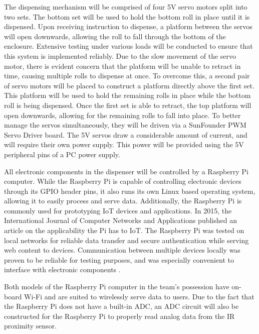 \par The dispensing mechanism will be comprised of four 5V servo motors split into two sets. The bottom set will be used to hold the bottom roll in place until it is dispensed. Upon receiving instruction to dispense, a platform between the servos will open downwards, allowing the roll to fall through the bottom of the enclosure. Extensive testing under various loads will be conducted to ensure that this system is implemented reliably. Due to the slow movement of the servo motor, there is evident concern that the platform will be unable to retract in time, causing multiple rolls to dispense at once. To overcome this, a second pair of servo motors will be placed to construct a platform directly above the first set. This platform will be used to hold the remaining rolls in place while the bottom roll is being dispensed. Once the first set is able to retract, the top platform will open downwards, allowing for the remaining rolls to fall into place. To better manage the servos simultaneously, they will be driven via a SunFounder PWM Servo Driver board. The 5V servos draw a considerable amount of current, and will require their own power supply. This power will be provided using the 5V peripheral pins of a PC power supply. 

\par All electronic components in the dispenser will be controlled by a Raspberry Pi computer. While the Raspberry Pi is capable of controlling electronic devices through its GPIO header pins, it also runs its own Linux based operating system, allowing it to easily process and serve data. Additionally, the Raspberry Pi is commonly used for prototyping IoT devices and applications. In 2015, the International Journal of Computer Networks and Applications published an article on the applicability the Pi has to IoT. The Raspberry Pi was tested on local networks for reliable data transfer and secure authentication while serving web content to devices. Communication between multiple devices locally was proven to be reliable for testing purposes, and was especially convenient to interface with electronic components \cite{raspberry_pi_iot}.
\par Both models of the Raspberry Pi computer in the team's possession have on-board Wi-Fi and are suited to wirelessly serve data to users. Due to the fact that the Raspberry Pi does not have a built-in ADC, an ADC circuit will also be constructed for the Raspberry Pi to properly read analog data from the IR proximity sensor. 

